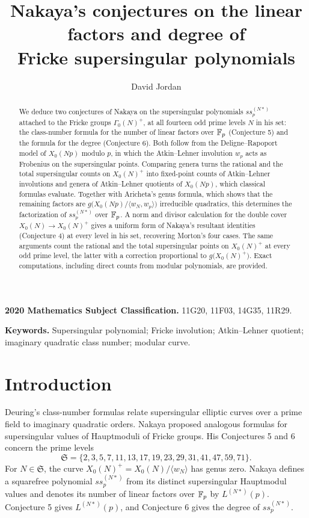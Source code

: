 \documentclass[11pt,a4paper]{article}
\title{Nakaya's conjectures on the linear factors and degree of\\Fricke supersingular polynomials}
\author{David Jordan}
\date{}
\theoremstyle{remark}\newtheorem{remark}[theorem]{Remark}
\numberwithin{equation}{section}
\begin{document}
	\maketitle
	\begin{abstract}
		We deduce two conjectures of Nakaya on the supersingular polynomials $ss_p^{(N*)}$ attached to the Fricke groups $\Gamma_0(N)^+$, at all fourteen odd prime levels $N$ in his set: the class-number formula for the number of linear factors over $\mathbb F_p$ (Conjecture 5) and the formula for the degree (Conjecture 6). Both follow from the Deligne--Rapoport model of $X_0(Np)$ modulo $p$, in which the Atkin--Lehner involution $w_p$ acts as Frobenius on the supersingular points. Comparing genera turns the rational and the total supersingular counts on $X_0(N)^+$ into fixed-point counts of Atkin--Lehner involutions and genera of Atkin--Lehner quotients of $X_0(Np)$, which classical formulas evaluate. Together with Aricheta's genus formula, which shows that the remaining factors are $g\bigl(X_0(Np)/\langle w_N,w_p\rangle\bigr)$ irreducible quadratics, this determines the factorization of $ss_p^{(N*)}$ over $\mathbb F_p$. A norm and divisor calculation for the double cover $X_0(N)\to X_0(N)^+$ gives a uniform form of Nakaya's resultant identities (Conjecture 4) at every level in his set, recovering Morton's four cases. The same arguments count the rational and the total supersingular points on $X_0(N)^+$ at every odd prime level, the latter with a correction proportional to $g\bigl(X_0(N)^+\bigr)$. Exact computations, including direct counts from modular polynomials, are provided.
	\end{abstract}
	\noindent\textbf{2020 Mathematics Subject Classification.} 11G20, 11F03, 14G35, 11R29.
	
	\noindent\textbf{Keywords.} Supersingular polynomial; Fricke involution; Atkin--Lehner quotient; imaginary quadratic class number; modular curve.
	
	\section{Introduction}
	Deuring's class-number formulas relate supersingular elliptic curves over a prime field to imaginary quadratic orders. Nakaya \cite{Nakaya} proposed analogous formulas for supersingular values of Hauptmoduli of Fricke groups. His Conjectures 5 and 6 concern the prime levels
	\[
	\mathfrak S=\{2,3,5,7,11,13,17,19,23,29,31,41,47,59,71\}.
	\]
	For $N\in\mathfrak S$, the curve $X_0(N)^+=X_0(N)/\langle w_N\rangle$ has genus zero. Nakaya defines a squarefree polynomial $ss_p^{(N*)}$ from its distinct supersingular Hauptmodul values and denotes its number of linear factors over $\mathbb F_p$ by $L^{(N*)}(p)$. Conjecture 5 gives $L^{(N*)}(p)$, and Conjecture 6 gives the degree of $ss_p^{(N*)}$.
	
\end{document}
